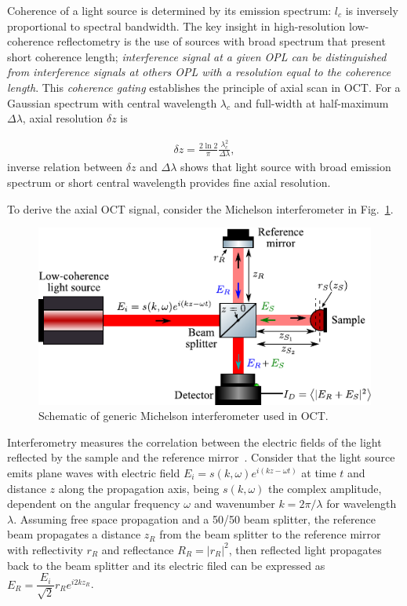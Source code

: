 Coherence of a light source is determined by its emission spectrum: $l_c$ is inversely proportional to spectral bandwidth. The key insight in high-resolution low-coherence reflectometry is the use of sources with broad spectrum that present short coherence length; \textit{interference signal at a given OPL can be distinguished from interference signals at others OPL with a resolution equal to the coherence length}. This \textit{coherence gating} establishes the principle of axial scan in OCT. For a Gaussian spectrum with central wavelength $\lambda_c$ and full-width at half-maximum $\Delta\lambda$, axial resolution $\delta z$ is

\begin{align}\label{eq:axialRes}
    \delta z = \frac{2\ln 2}{\pi}\frac{\lambda_c^2}{\Delta\lambda},
\end{align}
inverse relation between $\delta z$ and $\Delta\lambda$ shows that light source with broad emission spectrum or short central wavelength provides fine axial resolution.

To derive the axial OCT signal, consider the Michelson interferometer in Fig.~\ref{fig:OCT_Model}.

\begin{figure}[htb!]
    \centering
    \includegraphics[width=.65\textwidth]{Figures/TheoreticalBasis/OCT_Model.pdf}
    \caption{Schematic of generic Michelson interferometer used in OCT.}
    \label{fig:OCT_Model}
\end{figure}

Interferometry measures the correlation between the electric fields of the light reflected by the sample and the reference mirror~\cite{Malacara2007_Optical}. Consider that the light source emits plane waves with electric field $E_i = s(k,\omega)e^{i(kz-\omega t)}$ at time $t$ and distance $z$ along the propagation axis, being $s(k,\omega)$ the complex amplitude, dependent on the angular frequency $\omega$ and wavenumber $k=2\pi / \lambda$ for wavelength $\lambda$. Assuming free space propagation and a 50/50 beam splitter, the reference beam propagates a distance $z_R$ from the beam splitter to the reference mirror with reflectivity $r_R$ and reflectance $R_R=|r_R|^2$, then reflected light propagates back to the beam splitter and its electric filed can be expressed as $E_R = \dfrac{E_i}{\sqrt{2}} r_R e^{i2kz_R}$.

